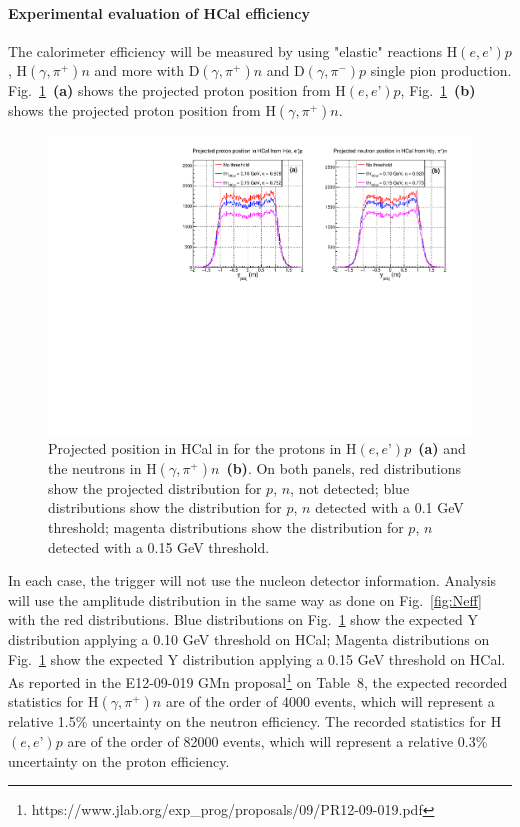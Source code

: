 \paragraph{Experimental evaluation of HCal efficiency}

The calorimeter efficiency will be measured by using "elastic" reactions H$(e,e’)p$, H$(\gamma,\pi^+)n$
and more with D$(\gamma,\pi^+)n$ and D$(\gamma,\pi^-)p$ single pion production.
Fig.~\ref{fig:Nproj}~{\bf(a)} shows the projected proton position from H$(e,e’)p$, 
Fig.~\ref{fig:Nproj}~{\bf(b)} shows the projected proton position from H$(\gamma,\pi^+)n$.
%
\begin{figure}[!h]
  \centering
  \includegraphics[width=12cm]{Answers_Readers/ProtVsNeut_CalibYproj.pdf}
  \caption{Projected position in HCal in for the protons in H$(e,e’)p$~{\bf(a)} and the neutrons in H$(\gamma,\pi^+)n$~{\bf(b)}. On both panels, red distributions show the projected distribution for $p$, $n$, not detected; blue distributions show the distribution for $p$, $n$ detected with a 0.1 GeV threshold; magenta distributions show the distribution for $p$, $n$ detected with a 0.15 GeV threshold.}
  \label{fig:Nproj}
\end{figure}
%
In each case, the trigger will not use the nucleon detector information.
Analysis will use the amplitude distribution in the same way as done on  Fig.~\ref{fig:Neff} with the red distributions.
Blue distributions on Fig.~\ref{fig:Nproj} show the expected Y distribution applying a 0.10 GeV threshold on HCal;
Magenta distributions on Fig.~\ref{fig:Nproj} show the expected Y distribution applying a 0.15 GeV threshold on HCal.
As reported in the E12-09-019 GMn proposal\footnote{https://www.jlab.org/exp\_prog/proposals/09/PR12-09-019.pdf} on Table~8, the expected recorded statistics for H$(\gamma,\pi^+)n$ are of the order of 4000 events, which will represent a relative 1.5\% uncertainty on the neutron efficiency. The recorded statistics for H$(e,e’)p$ are of the order of 82000 events, which will represent a relative 0.3\% uncertainty on the proton efficiency.\\

